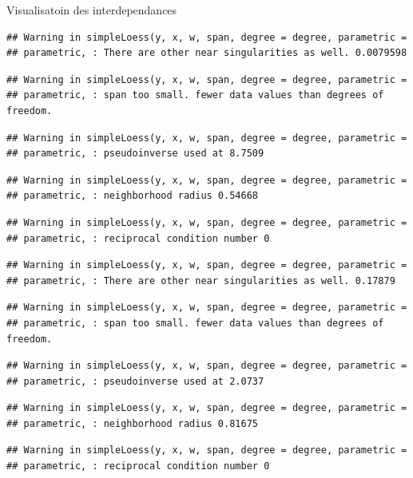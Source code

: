 \documentclass[11pt,ignorenonframetext,]{beamer}
\begin{document}
\begin{frame}[fragile]{Visualisatoin des interdependances}
\begin{verbatim}
## Warning in simpleLoess(y, x, w, span, degree = degree, parametric =
## parametric, : There are other near singularities as well. 0.0079598
\end{verbatim}

\begin{verbatim}
## Warning in simpleLoess(y, x, w, span, degree = degree, parametric =
## parametric, : span too small. fewer data values than degrees of freedom.
\end{verbatim}

\begin{verbatim}
## Warning in simpleLoess(y, x, w, span, degree = degree, parametric =
## parametric, : pseudoinverse used at 8.7509
\end{verbatim}

\begin{verbatim}
## Warning in simpleLoess(y, x, w, span, degree = degree, parametric =
## parametric, : neighborhood radius 0.54668
\end{verbatim}

\begin{verbatim}
## Warning in simpleLoess(y, x, w, span, degree = degree, parametric =
## parametric, : reciprocal condition number 0
\end{verbatim}

\begin{verbatim}
## Warning in simpleLoess(y, x, w, span, degree = degree, parametric =
## parametric, : There are other near singularities as well. 0.17879
\end{verbatim}

\begin{verbatim}
## Warning in simpleLoess(y, x, w, span, degree = degree, parametric =
## parametric, : span too small. fewer data values than degrees of freedom.
\end{verbatim}

\begin{verbatim}
## Warning in simpleLoess(y, x, w, span, degree = degree, parametric =
## parametric, : pseudoinverse used at 2.0737
\end{verbatim}

\begin{verbatim}
## Warning in simpleLoess(y, x, w, span, degree = degree, parametric =
## parametric, : neighborhood radius 0.81675
\end{verbatim}

\begin{verbatim}
## Warning in simpleLoess(y, x, w, span, degree = degree, parametric =
## parametric, : reciprocal condition number 0
\end{verbatim}


\end{frame}
\end{document}
